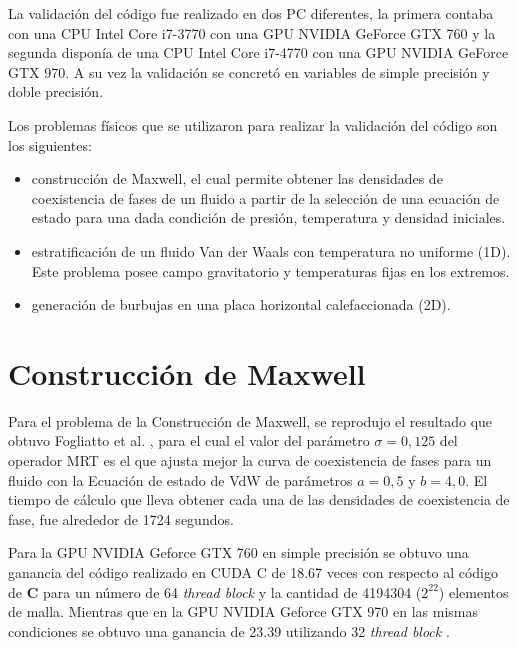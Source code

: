La validación del código fue realizado en dos PC diferentes, la primera contaba con una CPU Intel Core i7-3770 con una GPU NVIDIA GeForce GTX 760 y la segunda disponía de una CPU Intel Core i7-4770 con una GPU NVIDIA GeForce GTX 970. A su vez la validación se concretó en variables de simple precisión y doble precisión.

Los problemas físicos  que se utilizaron para realizar la validación del código son los siguientes:

\begin{itemize}
    
    \item construcción de Maxwell, el cual permite obtener las densidades de coexistencia de fases de un fluido a partir de la selección de una ecuación de estado para una dada condición de  presión, temperatura y densidad iniciales.

    \item estratificación de un fluido Van der Waals con temperatura no uniforme (1D). Este problema posee campo gravitatorio y temperaturas fijas en los extremos.

    \item generación de burbujas en una placa horizontal calefaccionada (2D).

\end{itemize}

\section{Construcción de Maxwell}

Para el problema de la Construcción de Maxwell, se reprodujo el resultado que obtuvo Fogliatto et al. \cite{fogliatto2019simulation}, para el cual el valor del parámetro $\sigma = 0,125$ del operador MRT es el que ajusta mejor la curva de coexistencia de fases para un fluido con la Ecuación de estado de VdW de parámetros $ a = 0,5 $ y $ b = 4,0 $. El tiempo de cálculo que lleva obtener  cada una de las densidades de coexistencia de fase, fue alrededor de 1724 segundos.

Para la GPU NVIDIA Geforce GTX 760 en simple precisión se obtuvo una ganancia del código realizado en \textsc{CUDA C} de 18.67 veces con respecto al código de \textbf{C} para un número de 64 \textit{thread block} y la cantidad de 4194304 ($2^{22}$) elementos de malla. Mientras que en la  GPU NVIDIA Geforce GTX 970 en las mismas condiciones se obtuvo una ganancia de 23.39 utilizando 32 \textit{thread block} .

